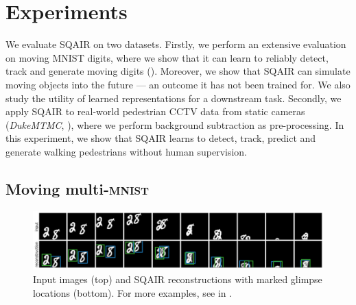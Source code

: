 \section{Experiments}
\label{sec:sqair_experiments}

We evaluate \gls{SQAIR} on two datasets.
Firstly, we perform an extensive evaluation on moving \gls{MNIST} digits, where we show that it can learn to reliably detect, track and generate moving digits (). Moreover, we show that \gls{SQAIR} can simulate moving objects into the future --- an outcome it has not been trained for. 
We also study the utility of learned representations for a downstream task.
Secondly, we apply \gls{SQAIR} to real-world pedestrian CCTV data from static cameras (\textit{DukeMTMC}, \cite{Ristani2016performance}), where we perform background subtraction as pre-processing. In this experiment, we show that \gls{SQAIR} learns to detect, track, predict and generate walking pedestrians without human supervision.

\subsection{Moving multi-\textsc{mnist}}
\label{sec:expr_mnist}

\begin{figure}
    \centering
    \includegraphics[width=\linewidth]{figures/SQAIR/mnist_rec/000106}
    \caption{Input images (top) and \gls{SQAIR} reconstructions with marked glimpse locations (bottom). For more examples, see  in .}
    \label{fig:mnist_recs}
\end{figure}

